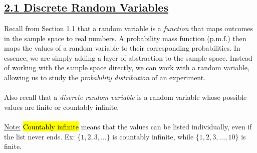 ﻿\documentclass[12pt]{article}
\begin{document}
\section*{}
\subsection*{\underline{2.1 Discrete Random Variables}}
Recall from Section 1.1 that a random variable is a \textit{function} that maps outcomes in the sample space to real numbers. A probability mass function (p.m.f.) then maps the values of a random variable to their corresponding probabilities. In essence, we are simply adding a layer of abstraction to the sample space. Instead of working with the sample space directly, we can work with a random variable, allowing us to study the \textit{probability distribution} of an experiment.\\\\
Also recall that a \textit{discrete random variable} is a random variable whose possible values are finite or countably infinite.\\\\
\underline{Note:} \hl{Countably infinite} means that the values can be listed individually, even if the list never ends. Ex: $\{1,2,3,\dots\}$ is countably infinite, while $\{1,2,3,\dots,10\}$ is finite.
\end{document}
